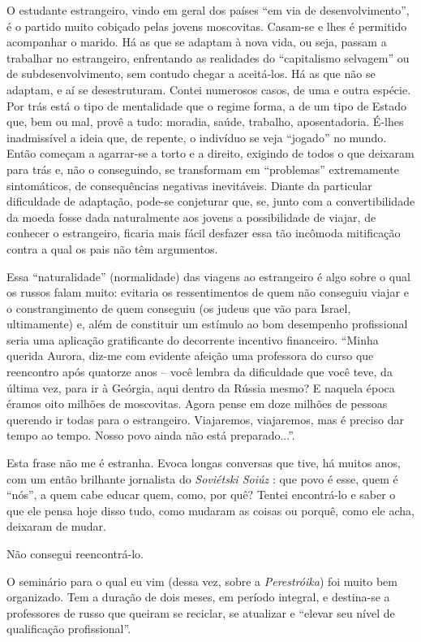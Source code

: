 O estudante estrangeiro, vindo em geral dos países ``em via de
desenvolvimento'', é o partido muito cobiçado pelas jovens moscovitas.
Casam-se e lhes é permitido acompanhar o marido. Há as que se adaptam à
nova vida, ou seja, passam a trabalhar no estrangeiro, enfrentando as
realidades do ``capitalismo selvagem'' ou de subdesenvolvimento, sem
contudo chegar a aceitá-los. Há as que não se adaptam, e aí se
desestruturam. Contei numerosos casos, de uma e outra espécie. Por trás
está o tipo de mentalidade que o regime forma, a de um tipo de Estado
que, bem ou mal, provê a tudo: moradia, saúde, trabalho, aposentadoria.
É-lhes inadmissível a ideia que, de repente, o indivíduo se veja
``jogado'' no mundo. Então começam a agarrar-se a torto e a direito,
exigindo de todos o que deixaram para trás e, não o conseguindo, se
transformam em ``problemas'' extremamente sintomáticos, de consequências
negativas inevitáveis. Diante da particular dificuldade de adaptação,
pode-se conjeturar que, se, junto com a convertibilidade da moeda fosse
dada naturalmente aos jovens a possibilidade de viajar, de conhecer o
estrangeiro, ficaria mais fácil desfazer essa tão incômoda mitificação
contra a qual os pais não têm argumentos.

Essa ``naturalidade'' (normalidade) das viagens ao estrangeiro é algo
sobre o qual os russos falam muito: evitaria os ressentimentos de quem
não conseguiu viajar e o constrangimento de quem conseguiu (os judeus
que vão para Israel, ultimamente) e, além de constituir um estímulo ao
bom desempenho profissional seria uma aplicação gratificante do
decorrente incentivo financeiro. ``Minha querida Aurora, diz-me com
evidente afeição uma professora do curso que reencontro após quatorze
anos -- você lembra da dificuldade que você teve, da última vez, para ir
à Geórgia, aqui dentro da Rússia mesmo? E naquela época éramos oito
milhões de moscovitas. Agora pense em doze milhões de pessoas querendo
ir todas para o estrangeiro. Viajaremos, viajaremos, mas é preciso dar
tempo ao tempo. Nosso povo ainda não está preparado...''.

Esta frase não me é estranha. Evoca longas conversas que tive, há muitos
anos, com um então brilhante jornalista do \emph{Soviétski Soiúz} : que
povo é esse, quem é ``nós'', a quem cabe educar quem, como, por quê?
Tentei encontrá-lo e saber o que ele pensa hoje disso tudo, como mudaram
as coisas ou porquê, como ele acha, deixaram de mudar.

Não consegui reencontrá-lo.

O seminário para o qual eu vim (dessa vez, sobre a \emph{Perestróika})
foi muito bem organizado. Tem a duração de dois meses, em período
integral, e destina-se a professores de russo que queiram se reciclar,
se atualizar e ``elevar seu nível de qualificação profissional''.

